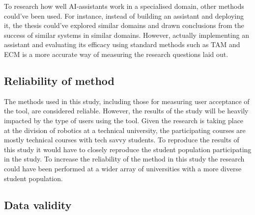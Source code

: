 



To research how well AI-assistants work in a specialised domain, other methods could’ve been used. For instance, instead of building an assistant and deploying it, the thesis could’ve explored similar domains and drawn conclusions from the success of similar systems in similar domains. However, actually implementing an assistant and evaluating its efficacy using standard methods such as \gls{TAM} and \gls{ECM} is a more accurate way of measuring the research questions laid out.


\subsection{Reliability of method}
\label{sec:reliabilityOfMethod}




The methods used in this study, including those for measuring user acceptance of the tool, are considered reliable. However, the results of the study will be heavily impacted by the type of users using the tool. Given the research is taking place at the division of robotics at a technical university, the participating courses are mostly technical courses with tech savvy students. To reproduce the results of this study it would have to closely reproduce the student population participating in the study. To increase the reliability of the method in this study the research could have been performed at a wider array of universities with a more diverse student population.


\subsection{Data validity}
\label{sec:dataValidity}



